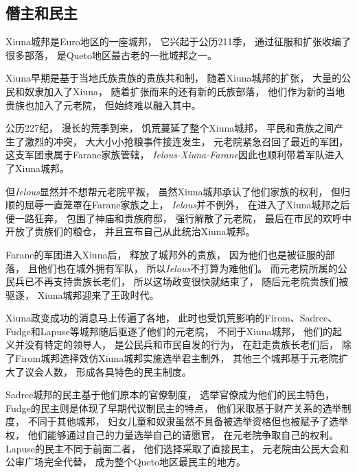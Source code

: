 \documentclass[UTF8,12pt,draft]{ctexbook}
\begin{document}
            \subsection{僭主和民主}
                Xiuna城邦是Euro地区的一座城邦，
                它兴起于公历211季，
                通过征服和扩张收编了很多部落，
                是Queto地区最古老的一批城邦之一。

                Xiuna早期是基于当地氏族贵族的贵族共和制，
                随着Xiuna城邦的扩张，
                大量的公民和奴隶加入了Xiuna，
                随着扩张而来的还有新的氏族部落，
                他们作为新的当地贵族也加入了元老院，
                但始终难以融入其中。

                公历227纪，
                漫长的荒季到来，
                饥荒蔓延了整个Xiuna城邦，
                平民和贵族之间产生了激烈的冲突，
                大大小小抢粮事件接连发生，
                元老院紧急召回了最近的军团，
                这支军团隶属于Farane家族管辖，
                \emph{Ielous-Xiuna-Farane}因此也顺利带着军队进入了Xiuna城邦。

                但\emph{Ielous}显然并不想帮元老院平叛，
                虽然Xiuna城邦承认了他们家族的权利，
                但归顺的屈辱一直笼罩在Farane家族之上，
                \emph{Ielous}并不例外，
                在进入了Xiuna城邦之后便一路狂奔，
                包围了神庙和贵族府邸，
                强行解散了元老院，
                最后在市民的欢呼中开放了贵族们的粮仓，
                并且宣布自己从此统治Xiuna城邦。

                Farane的军团进入Xiuna后，
                释放了城邦外的贵族，
                因为他们也是被征服的部落，
                且他们也在城外拥有军队，
                所以\emph{Ielous}不打算为难他们。
                而元老院所属的公民兵已不再支持贵族长老们，
                所以这场政变很快就结束了，
                随后元老院贵族们被驱逐，
                Xiuna城邦迎来了王政时代。

                Xiuna政变成功的消息马上传遍了各地，
                此时也受饥荒影响的Firom、Sadrce、Fudge和Lapuse等城邦随后驱逐了他们的元老院，
                不同于Xiuna城邦，
                他们的起义并没有特定的领导人，
                是公民兵和市民自发的行为，
                在赶走贵族长老们后，
                除了Firom城邦选择效仿Xiuna城邦实施选举君主制外，
                其他三个城邦基于元老院扩大了议会人数，
                形成各具特色的民主制度。

                Sadrce城邦的民主基于他们原本的官僚制度，
                选举官僚成为他们的民主特色，
                Fudge的民主则是体现了早期代议制民主的特点，
                他们采取基于财产关系的选举制度，
                不同于其他城邦，
                妇女儿童和奴隶虽然不具备被选举资格但也被赋予了选举权，
                他们能够通过自己的力量选举自己的请愿官，
                在元老院争取自己的权利。
                Lapuse的民主不同于前面二者，
                他们选择采取了直接民主，
                元老院由公民大会和公审广场完全代替，
                成为整个Queto地区最民主的地方。
\end{document}
